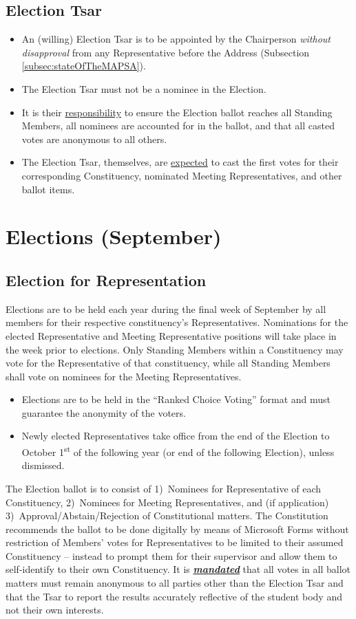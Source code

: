 \documentclass[8pt]{article}
\begin{document}
	\subsection{Election Tsar}
	\begin{itemize}
	\item An (willing) Election Tsar is to be appointed by the Chairperson \textit{without disapproval} from any Representative before the Address (Subsection \ref{subsec:stateOfTheMAPSA}).
	\item The Election Tsar must not be a nominee in the Election.
	\item It is their \underline{responsibility} to ensure the Election ballot reaches all Standing Members, all nominees are accounted for in the ballot, and that all casted votes are anonymous to all others.
	\item The Election Tsar, themselves, are \underline{expected} to cast the first votes for their corresponding Constituency, nominated Meeting Representatives, and other ballot items.
	\end{itemize}
	\section{Elections (September)}
	\subsection{Election for Representation}\label{sec:elections}
	Elections are to be held each year during the final week of September by all members for their respective constituency's Representatives. Nominations for the elected Representative and Meeting Representative positions will take place in the week prior to elections. Only Standing Members within a Constituency may vote for the Representative of that constituency, while all Standing Members shall vote on nominees for the Meeting Representatives. 
	\begin{itemize}	
		\item Elections are to be held in the ``Ranked Choice Voting'' format and must guarantee the anonymity of the voters. 
		\item Newly elected Representatives take office from the end of the Election to October 1\textsuperscript{st} of the following year (or end of the following Election), unless dismissed.
	\end{itemize}
	The Election ballot is to consist of 1)~Nominees for Representative of each Constituency, 2)~Nominees for Meeting Representatives, and (if application) 3)~Approval/Abstain/Rejection of Constitutional matters. The Constitution recommends the ballot to be done digitally by means of Microsoft Forms without restriction of Members' votes for Representatives to be limited to their assumed Constituency -- instead to prompt them for their supervisor and allow them to self-identify to their own Constituency. It is \textbf{\textit{\underline{mandated}}} that all votes in all ballot matters must remain anonymous to all parties other than the Election Tsar and that the Tsar to report the results accurately reflective of the student body and not their own interests.
	
\end{document}
